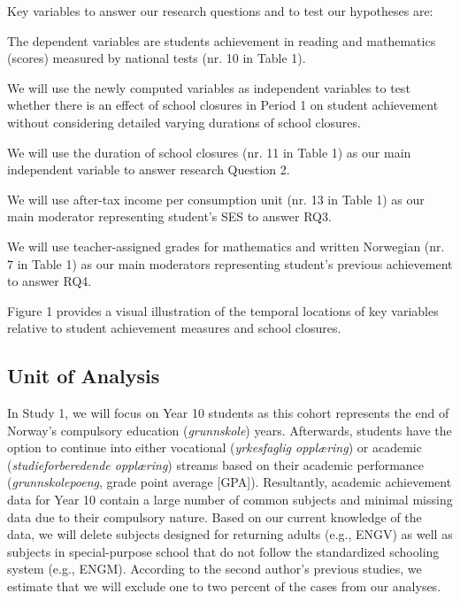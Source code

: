 Key variables to answer our research questions and to test our hypotheses are:
\begin{APAenumerate}
    \item The dependent variables are students achievement in reading and mathematics (scores) measured by national tests (nr. 10 in Table 1).
    \item We will use the newly computed variables  as independent variables to test whether there is an effect of school closures in Period 1 on student achievement without considering detailed varying durations of school closures.
    \item We will use the duration of school closures (nr. 11 in Table 1) as our main independent variable to answer research Question 2.
    \item We will use after-tax income per consumption unit (nr. 13 in Table 1) as our main moderator representing student's SES to answer RQ3.
    \item We will use teacher-assigned grades for mathematics and written Norwegian (nr. 7 in Table 1) as our main moderators representing student's previous achievement to answer RQ4.
\end{APAenumerate}

Figure 1 provides a visual illustration of the temporal locations of key variables relative to student achievement measures and school closures.

\subsection{Unit of Analysis}
In Study 1, we will focus on Year 10 students as this cohort represents the end of Norway's compulsory education (\textit{grunnskole}) years. Afterwards, students have the option to continue into either vocational (\textit{yrkesfaglig oppl{\ae}ring}) or academic (\textit{studieforberedende oppl{\ae}ring}) streams based on their academic performance (\textit{grunnskolepoeng}, grade point average [GPA]). Resultantly, academic achievement data for Year 10 contain a large number of common subjects and minimal missing data due to their compulsory nature. Based on our current knowledge of the data, we will delete subjects designed for returning adults (e.g., ENGV) as well as subjects in special-purpose school that do not follow the standardized schooling system (e.g., ENGM). According to the second author's previous studies, we estimate that we will exclude one to two percent of the cases from our analyses.


